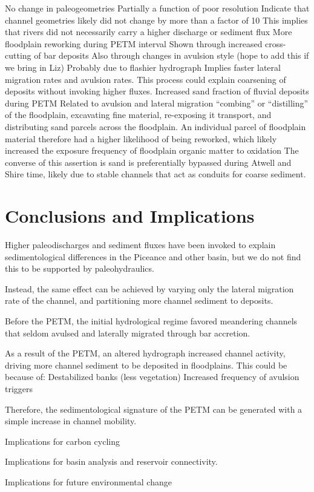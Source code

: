 \documentclass[draft]{compact_proposal}
\begin{document}
No change in paleogeometries
  Partially a function of poor resolution
  Indicate that channel geometries likely did not change by more than a factor of 10
  This implies that rivers did not necessarily carry a higher discharge or sediment flux
More floodplain reworking during PETM interval
  Shown through increased cross-cutting of bar deposits
  Also through changes in avulsion style (hope to add this if we bring in Liz)
  Probably due to flashier hydrograph
  Implies faster lateral migration rates and avulsion rates.
  This process could explain coarsening of deposits without invoking higher fluxes.
Increased sand fraction of fluvial deposits during PETM
  Related to avulsion and lateral migration “combing” or “distilling” of the floodplain, excavating fine material, re-exposing it transport, and distributing sand parcels across the floodplain.
  An individual parcel of floodplain material therefore had a higher likelihood of being reworked, which likely increased the exposure frequency of floodplain organic matter to oxidation
  The converse of this assertion is sand is preferentially bypassed during Atwell and Shire time, likely due to stable channels that act as conduits for coarse sediment.

\section{Conclusions and Implications}


Higher paleodischarges and sediment fluxes have been invoked to explain sedimentological differences in the Piceance and other basin, but we do not find this to be supported by paleohydraulics.

Instead, the same effect can be achieved by varying only the lateral migration rate of the channel, and partitioning more channel sediment to deposits.

Before the PETM, the initial hydrological regime favored meandering channels that seldom avulsed and laterally migrated through bar accretion.

As a result of the PETM, an altered hydrograph increased channel activity, driving more channel sediment to be deposited in floodplains. This could be because of:
    Destabilized banks (less vegetation)
    Increased frequency of avulsion triggers

Therefore, the sedimentological signature of the PETM can be generated with a simple increase in channel mobility.

Implications for carbon cycling

Implications for basin analysis and reservoir connectivity.

Implications for future environmental change


\printbibliography
\end{document}
